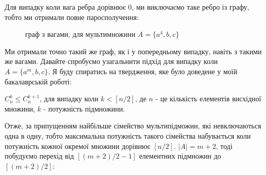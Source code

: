 Для випадку коли  вага ребра дорівнює $ 0 $, ми виключаємо таке ребро із графу, тобто ми отримали повне паросполучення:
\begin{figure}
\begin{center}
\end{center}
\caption{граф з вагами, для мультимножини  $ A = \{a^4, b, c\} $}
\end{figure}

Ми отримали точно такий же граф, як і у попередньому випадку, навіть з такими же вагами. Давайте спробуємо узагальнити підхід для випадку коли $ A = \{a^m, b, c\} $. Я буду спиратись на твердження, яке було доведене у моїй бакалаврській роботі:

\begin{center}
$ C_n^{k} \leq C_n^{k+1} $, для випадку коли $ k < [n/2]$, де $n$ - це кількість елементів висхідної множини, $k$ - потужність підмножини.
\end{center}

Отже, за припущенням найбільше сімейство мультипідможин, які невключаються одна в одну, тобто максимальна потужність такого сімейства набувається коли потужність кожної окремої множини дорівнює $ [n/2] $. $|A| = m + 2$, тоді побудуємо перехід від $ [(m+2)/2 - 1]$ елементних підмножин до $ [(m+2)/2]$:

